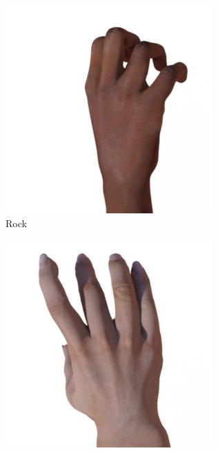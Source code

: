 \begin{figure}[H]
    \centering
    \begin{subfigure}[t]{0.3\textwidth}
        \centering
        \includegraphics[width=\linewidth]{imagenes/dataset_examples/rock.jpg}
        \caption*{Rock}
    \end{subfigure}
    \begin{subfigure}[t]{0.3\textwidth}
        \centering
        \includegraphics[width=\linewidth]{imagenes/dataset_examples/paper.jpg}

\end{subfigure}
\end{figure}
